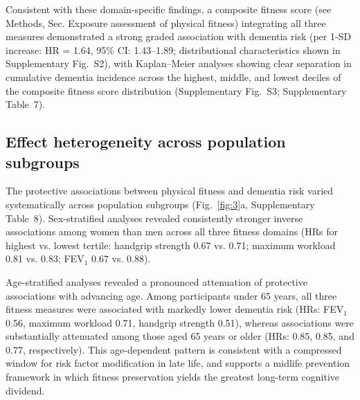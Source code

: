 \documentclass{article}
\begin{document}
Consistent with these domain-specific findings, a composite fitness score (see Methods, Sec.  Exposure assessment of physical fitness)
integrating all three measures demonstrated a strong graded association with 
dementia risk (per 1-SD increase: HR = 1.64, 95\% CI: 1.43--1.89; distributional characteristics shown in Supplementary Fig.~S2), with 
Kaplan--Meier analyses showing clear separation in cumulative dementia incidence 
across the highest, middle, and lowest deciles of the composite fitness score distribution 
(Supplementary Fig.~S3; Supplementary Table~7).


\subsection*{Effect heterogeneity across population subgroups}

The protective associations between physical fitness and dementia risk varied systematically across population subgroups (Fig.~\ref{fig:3}a, Supplementary Table~8).
Sex-stratified analyses revealed consistently stronger inverse associations among women than men across all three fitness domains (HRs for highest vs. lowest tertile: handgrip strength 0.67 vs. 0.71; maximum workload 0.81 vs. 0.83; FEV$_1$ 0.67 vs. 0.88).

Age-stratified analyses revealed a pronounced attenuation of protective associations with advancing age.
Among participants under 65 years, all three fitness measures were associated with markedly lower dementia risk (HRs: FEV$_1$ 0.56, maximum workload 0.71, handgrip strength 0.51), whereas associations were substantially attenuated among those aged 65 years or older (HRs: 0.85, 0.85, and 0.77, respectively).
This age-dependent pattern is consistent with a compressed window for risk factor modification in late life, and supports a midlife prevention framework in which fitness preservation yields the greatest long-term cognitive dividend.
\end{document}
